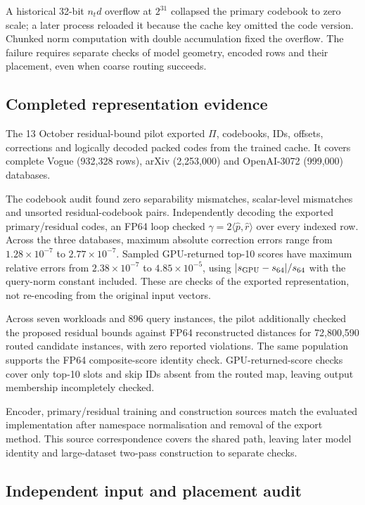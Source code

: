 A historical 32-bit $n_t d$ overflow at $2^{31}$ collapsed the primary
codebook to zero scale; a later process reloaded it because the cache key
omitted the code version. Chunked norm computation with double accumulation
fixed the overflow. The failure requires separate checks of model geometry,
encoded rows and their placement, even when coarse routing succeeds.

\subsection{Completed representation evidence}

The 13 October residual-bound pilot exported $\Pi$, codebooks, IDs,
offsets, corrections and logically decoded packed codes from the trained cache. It covers complete Vogue (932,328 rows), arXiv (2,253,000)
and OpenAI-3072 (999,000) databases.

The codebook audit found zero separability mismatches, scalar-level
mismatches and unsorted residual-codebook pairs. Independently decoding
the exported primary/residual codes, an FP64 loop checked
$\gamma=2\langle\widehat p,\widehat r\rangle$ over every indexed row.
Across the three databases, maximum absolute correction errors range
from $1.28\times10^{-7}$ to $2.77\times10^{-7}$. Sampled GPU-returned
top-10 scores have maximum relative errors from $2.38\times10^{-7}$ to
$4.85\times10^{-5}$, using $|s_{\rm GPU}-s_{64}|/s_{64}$ with the
query-norm constant included. These are checks of the exported
representation, not re-encoding from the original input vectors.


Across seven workloads and 896 query instances, the pilot additionally
checked the proposed residual bounds against FP64 reconstructed distances
for 72,800,590 routed candidate instances, with zero reported violations.
The same population supports the FP64 composite-score identity check.
GPU-returned-score checks cover only top-10 slots and skip IDs absent
from the routed map, leaving output membership incompletely checked.

Encoder, primary/residual training and construction sources match the
evaluated implementation after namespace normalisation and removal of
the export method. This source
correspondence covers the shared path, leaving later model identity and
large-dataset two-pass construction to separate checks.

\subsection{Independent input and placement audit}
\label{sec:4-representation-audit}

